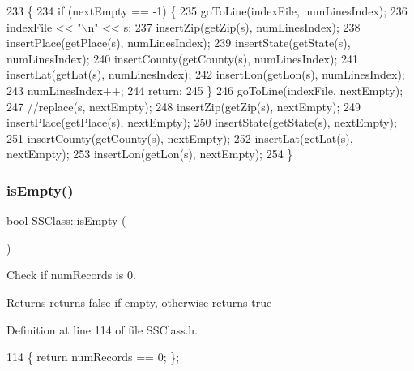 \begin{DoxyCode}
233                              \{
234     \textcolor{keywordflow}{if} (nextEmpty == -1) \{
235         goToLine(indexFile, numLinesIndex);
236         indexFile << \textcolor{stringliteral}{"\(\backslash\)n"} << s;
237         insertZip(getZip(s), numLinesIndex);
238         insertPlace(getPlace(s), numLinesIndex);
239         insertState(getState(s), numLinesIndex);
240         insertCounty(getCounty(s), numLinesIndex);
241         insertLat(getLat(s), numLinesIndex);
242         insertLon(getLon(s), numLinesIndex);
243         numLinesIndex++;
244         \textcolor{keywordflow}{return};
245     \}
246     goToLine(indexFile, nextEmpty);
247     \textcolor{comment}{//replace(s, nextEmpty);}
248     insertZip(getZip(s), nextEmpty);
249     insertPlace(getPlace(s), nextEmpty);
250     insertState(getState(s), nextEmpty);
251     insertCounty(getCounty(s), nextEmpty);
252     insertLat(getLat(s), nextEmpty);
253     insertLon(getLon(s), nextEmpty);
254 \}
\end{DoxyCode}
\mbox{\label{classSSClass_afc95611385e4d389818332414d5c491c}} 
\subsubsection{\texorpdfstring{is\+Empty()}{isEmpty()}}
{\footnotesize\ttfamily bool S\+S\+Class\+::is\+Empty (\begin{DoxyParamCaption}{ }\end{DoxyParamCaption})\hspace{0.3cm}{\ttfamily [inline]}}



Check if num\+Records is 0. 

\begin{DoxyReturn}{Returns}
returns false if empty, otherwise returns true 
\end{DoxyReturn}


Definition at line 114 of file S\+S\+Class.\+h.


\begin{DoxyCode}
114 \{ \textcolor{keywordflow}{return} numRecords == 0; \};
\end{DoxyCode}
\mbox{\label{classSSClass_a92e012441608ea36f3013fb3cbea9da8}} 

